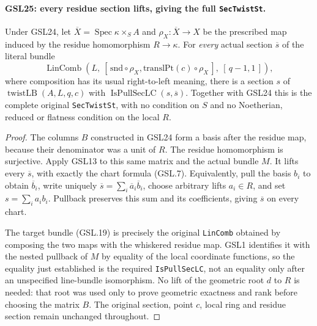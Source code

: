\documentclass[11pt,a4paper]{article}
\numberwithin{equation}{section}
\theoremstyle{remark}\newtheorem{remark}[theorem]{Remark}
\begin{document}
\paragraph{GSL25: every residue section lifts, giving the full \texttt{Sec\allowbreak Twist\allowbreak St}.}
\label{claim:GSL25}
Under GSL24, let $\overline X=\operatorname{Spec}\kappa\times_S A$
and $\rho_X:\overline X\to X$ be the prescribed map induced by
the residue homomorphism $R\to\kappa$.  For \emph{every} actual
section $\overline s$ of the literal bundle
\[
 \operatorname{LinComb}\!\left(
   L,\ [\,\mathrm{snd}\circ\rho_X,
              \mathrm{translPt}(c)\circ\rho_X\,],\
          [\,q-1,1\,]\right),
 \tag{GSL.19}
\]
where composition has its usual right-to-left meaning,
there is a section $s$ of
$\operatorname{twistLB}(A,L,q,c)$ with
$\operatorname{IsPullSecLC}(s,\overline s)$.
Together with GSL24 this is the complete original
\texttt{Sec\allowbreak Twist\allowbreak St}, with no condition on $S$ and no
Noetherian, reduced or flatness condition on the local $R$.

\begin{proof}
The columns $B$ constructed in GSL24 form a basis after the
residue map, because their denominator was a unit of $R$.
The residue homomorphism is surjective.  Apply GSL13 to
this same matrix and the actual bundle $M$.  It lifts every
$\overline s$, with exactly the chart formula (GSL.7).
Equivalently, pull the basis $b_i$ to obtain $\overline b_i$,
write uniquely $\overline s=\sum_i\overline a_i\overline b_i$,
choose arbitrary lifts $a_i\in R$, and set $s=\sum_i a_i b_i$.
Pullback preserves this sum and its coefficients, giving
$\overline s$ on every chart.

The target bundle (GSL.19) is precisely the original
\texttt{Lin\allowbreak Comb} obtained by composing the two maps with the
whiskered residue map.  GSL1 identifies it with the nested
pullback of $M$ by equality of the local coordinate functions,
so the equality just established is the required
\texttt{Is\allowbreak Pull\allowbreak Sec\allowbreak LC}, not an equality only after an unspecified
line-bundle isomorphism.  No lift of the geometric root $d$
to $R$ is needed: that root was used only to prove geometric
exactness and rank before choosing the matrix $B$.
The original section, point $c$, local ring and residue
section remain unchanged throughout.
\end{proof}

\end{document}
